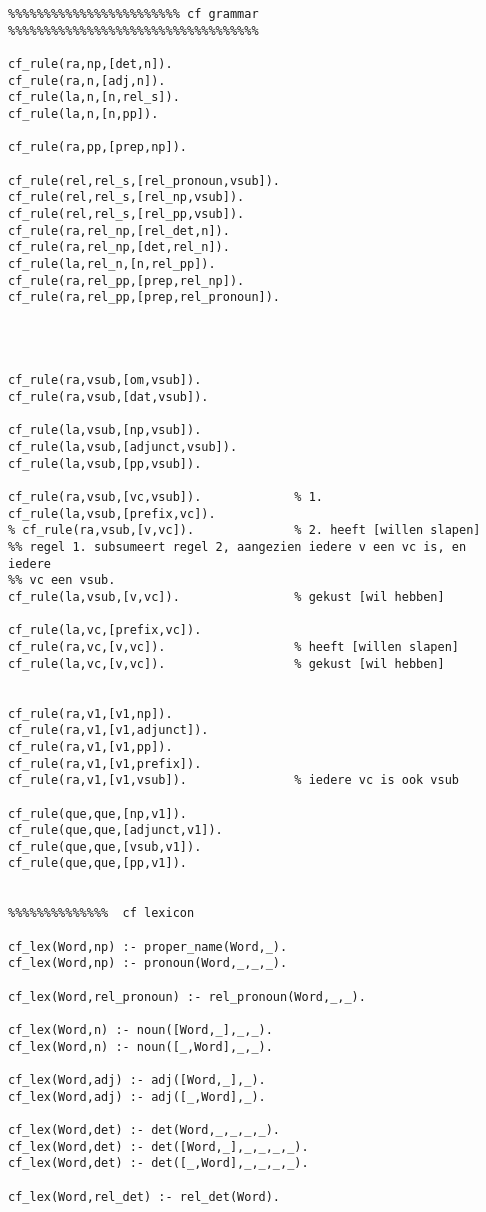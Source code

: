 \begin{verbatim}
%%%%%%%%%%%%%%%%%%%%%%%% cf grammar %%%%%%%%%%%%%%%%%%%%%%%%%%%%%%%%%%%

cf_rule(ra,np,[det,n]).
cf_rule(ra,n,[adj,n]).
cf_rule(la,n,[n,rel_s]).
cf_rule(la,n,[n,pp]).

cf_rule(ra,pp,[prep,np]).

cf_rule(rel,rel_s,[rel_pronoun,vsub]).
cf_rule(rel,rel_s,[rel_np,vsub]).
cf_rule(rel,rel_s,[rel_pp,vsub]).
cf_rule(ra,rel_np,[rel_det,n]).
cf_rule(ra,rel_np,[det,rel_n]).
cf_rule(la,rel_n,[n,rel_pp]).
cf_rule(ra,rel_pp,[prep,rel_np]).
cf_rule(ra,rel_pp,[prep,rel_pronoun]).




cf_rule(ra,vsub,[om,vsub]).
cf_rule(ra,vsub,[dat,vsub]).

cf_rule(la,vsub,[np,vsub]).
cf_rule(la,vsub,[adjunct,vsub]).
cf_rule(la,vsub,[pp,vsub]).

cf_rule(ra,vsub,[vc,vsub]).             % 1.
cf_rule(la,vsub,[prefix,vc]).
% cf_rule(ra,vsub,[v,vc]).              % 2. heeft [willen slapen]
%% regel 1. subsumeert regel 2, aangezien iedere v een vc is, en iedere
%% vc een vsub.
cf_rule(la,vsub,[v,vc]).                % gekust [wil hebben]

cf_rule(la,vc,[prefix,vc]).
cf_rule(ra,vc,[v,vc]).                  % heeft [willen slapen]
cf_rule(la,vc,[v,vc]).                  % gekust [wil hebben]


cf_rule(ra,v1,[v1,np]).
cf_rule(ra,v1,[v1,adjunct]).
cf_rule(ra,v1,[v1,pp]).
cf_rule(ra,v1,[v1,prefix]).
cf_rule(ra,v1,[v1,vsub]).               % iedere vc is ook vsub

cf_rule(que,que,[np,v1]).
cf_rule(que,que,[adjunct,v1]).
cf_rule(que,que,[vsub,v1]).
cf_rule(que,que,[pp,v1]).


%%%%%%%%%%%%%%  cf lexicon

cf_lex(Word,np) :- proper_name(Word,_).
cf_lex(Word,np) :- pronoun(Word,_,_,_). 

cf_lex(Word,rel_pronoun) :- rel_pronoun(Word,_,_). 

cf_lex(Word,n) :- noun([Word,_],_,_).
cf_lex(Word,n) :- noun([_,Word],_,_).

cf_lex(Word,adj) :- adj([Word,_],_).
cf_lex(Word,adj) :- adj([_,Word],_).

cf_lex(Word,det) :- det(Word,_,_,_,_).
cf_lex(Word,det) :- det([Word,_],_,_,_,_).
cf_lex(Word,det) :- det([_,Word],_,_,_,_).

cf_lex(Word,rel_det) :- rel_det(Word).




\end{verbatim}
